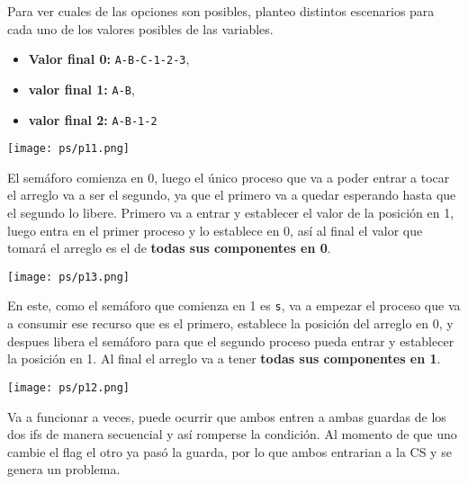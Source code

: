 \documentclass[openany]{book}
\begin{document}
\begin{rta}
    Para ver cuales de las opciones son posibles, planteo distintos escenarios para cada uno de los valores posibles de las variables.
    \begin{itemize}
        \item \textbf{Valor final 0:} \texttt{A-B-C-1-2-3},
        \item \textbf{valor final 1:} \texttt{A-B},
        \item \textbf{valor final 2:} \texttt{A-B-1-2}
    \end{itemize}
\end{rta}
\texttt{[image: ps/p11.png]}

\begin{rta}
    El semáforo comienza en 0, luego el único proceso que va a poder entrar a tocar el arreglo va a ser el segundo, ya que el primero va a quedar esperando hasta que el segundo lo libere. Primero va a entrar y establecer el valor de la posición en 1, luego entra en el primer proceso y lo establece en 0, así al final el valor que tomará el arreglo es el de \textbf{todas sus componentes en 0}.    
\end{rta}
\newpage
\texttt{[image: ps/p13.png]}

\begin{rta}
    En este, como el semáforo que comienza en 1 es \texttt{s}, va a empezar el proceso que va a consumir ese recurso que es el primero, establece la posición del arreglo en 0, y despues libera el semáforo para que el segundo proceso pueda entrar y establecer la posición en 1. Al final el arreglo va a tener \textbf{todas sus componentes en 1}.    
\end{rta}
\texttt{[image: ps/p12.png]}
\begin{rta}
    Va a funcionar a veces, puede ocurrir que ambos entren a ambas guardas de los dos ifs de manera secuencial y así romperse la condición. Al momento de que uno cambie el flag el otro ya pasó la guarda, por lo que ambos entrarian a la CS y se genera un problema.
\end{rta}
\end{document}
